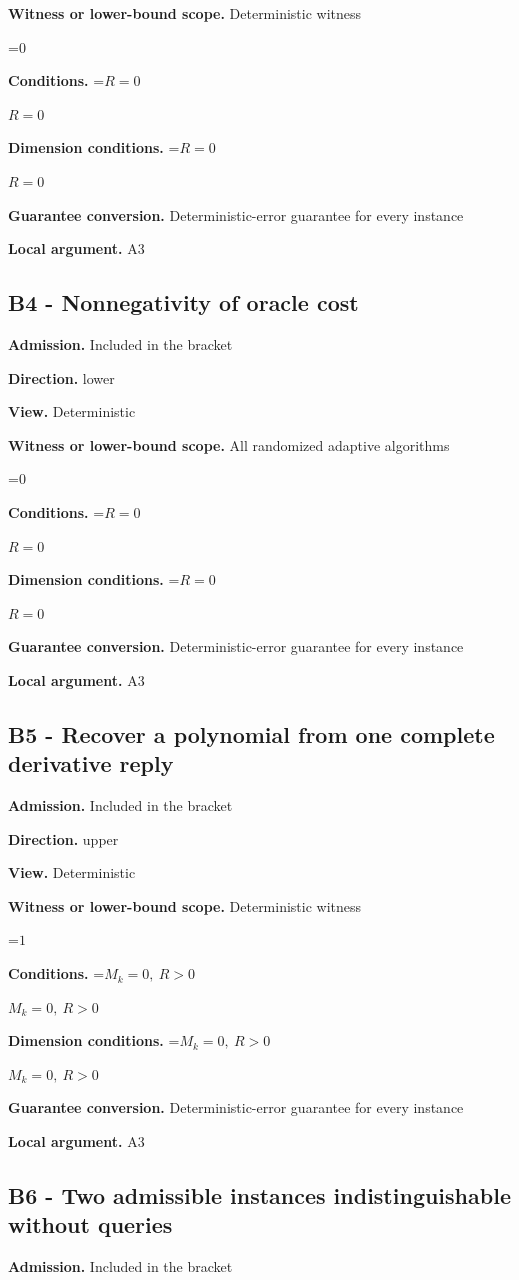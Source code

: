 \documentclass[10pt,a4paper]{article}
\newcommand{\AtlasMath}[1]{\par\begingroup\centering\setbox0=\hbox{$\displaystyle #1$}\ifdim\wd0>1.4\linewidth\typeout{ATLAS WIDE FORMULA: \the\wd0}\fi\ifdim\wd0>\linewidth\resizebox{\linewidth}{!}{\box0}\else\box0\fi\par\endgroup}
\newcommand{\AtlasInlineMath}[1]{\begingroup\setbox0=\hbox{$#1$}\ifdim\wd0>.4\linewidth\endgroup\AtlasMath{#1}\else\endgroup$#1$\fi}
\begin{document}
\textbf{Witness or lower-bound scope.} Deterministic witness

\AtlasMath{0}
\textbf{Conditions.} \AtlasInlineMath{R=0}

\textbf{Dimension conditions.} \AtlasInlineMath{R=0}

\textbf{Guarantee conversion.} Deterministic-error guarantee for every instance

\textbf{Local argument.} A3

\subsection{B4 - Nonnegativity of oracle cost}
\textbf{Admission.} Included in the bracket

\textbf{Direction.} lower

\textbf{View.} Deterministic

\textbf{Witness or lower-bound scope.} All randomized adaptive algorithms

\AtlasMath{0}
\textbf{Conditions.} \AtlasInlineMath{R=0}

\textbf{Dimension conditions.} \AtlasInlineMath{R=0}

\textbf{Guarantee conversion.} Deterministic-error guarantee for every instance

\textbf{Local argument.} A3

\subsection{B5 - Recover a polynomial from one complete derivative reply}
\textbf{Admission.} Included in the bracket

\textbf{Direction.} upper

\textbf{View.} Deterministic

\textbf{Witness or lower-bound scope.} Deterministic witness

\AtlasMath{1}
\textbf{Conditions.} \AtlasInlineMath{M_k=0,\ R>0}

\textbf{Dimension conditions.} \AtlasInlineMath{M_k=0,\ R>0}

\textbf{Guarantee conversion.} Deterministic-error guarantee for every instance

\textbf{Local argument.} A3

\subsection{B6 - Two admissible instances indistinguishable without queries}
\textbf{Admission.} Included in the bracket
\end{document}
